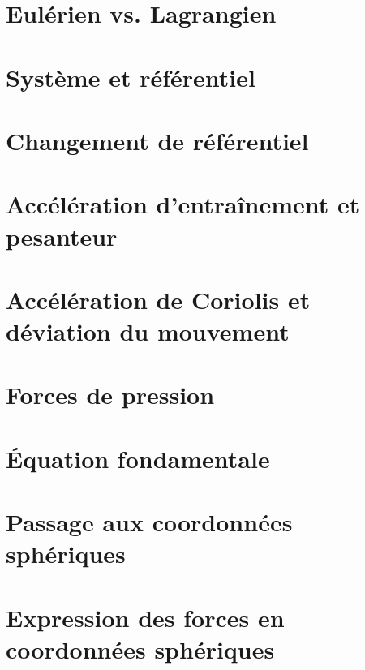\documentclass[a4paper,DIV16,10pt]{scrartcl}
\begin{document}
 \inidoc

\newpage
\section{Eulérien vs. Lagrangien}


\newpage
\section{Système et référentiel}


\newpage
\section{Changement de référentiel}


\newpage
\section{Accélération d'entraînement et pesanteur}


\newpage
\section{Accélération de Coriolis et déviation du mouvement}


\newpage
\section{Forces de pression}


\newpage
\section{\'Equation fondamentale}


\newpage
\section{Passage aux coordonnées sphériques}


\newpage
\section{Expression des forces en coordonnées sphériques}

\end{document}
